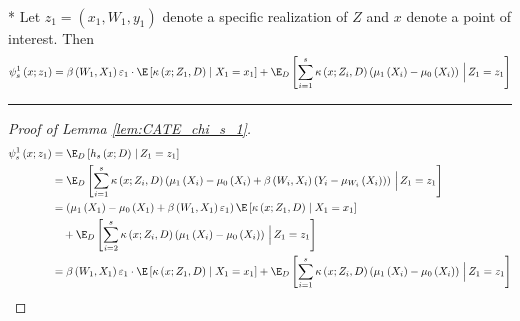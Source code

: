\begin{lem}\label{lem:CATE_chi_s_1}\mbox{}\\*
	Let $z_1 = (x_1, W_{1}, y_1)$ denote a specific realization of $Z$ and $x$ denote a point of interest.
	Then
	\begin{equation}
		\psi_{s}^{1}\left(x; z_1\right)
		= \beta\left(W_{1}, X_1\right)\varepsilon_{1} \cdot \E\left[\kappa\left(x; Z_1, D\right) \; \middle| \; X_1 = x_1\right]
		+ \E_{D}\left[\sum_{i = 1}^{s} \kappa\left(x; Z_{i}, D\right) \left(\mu_{1}\left(X_{i}\right) - \mu_{0}\left(X_{i}\right)\right)
		\, \Big| \, Z_1 = z_1 \right]
	\end{equation}
\end{lem}
\hrule
\begin{proof}[Proof of Lemma \ref{lem:CATE_chi_s_1}]
	\begin{equation}
		\begin{aligned}
			\psi_{s}^{1}\left(x; z_1\right)
			 & = \E_{D}\left[h_{s}\left(x; D\right) \, | \, Z_1 = z_1 \right] \\
			 & = \E_{D}\left[\sum_{i = 1}^{s} \kappa\left(x; Z_{i}, D\right) \left(\mu_{1}\left(X_{i}\right) - \mu_{0}\left(X_{i}\right) + \beta\left(W_{i}, X_{i}\right)\left(Y_{i} - \mu_{W_{i}}\left(X_{i}\right)\right)\right)
			 \, \Big| \, Z_1 = z_1 \right]\\
			 & = \left(\mu_{1}\left(X_1\right) - \mu_{0}\left(X_1\right) + \beta\left(W_{1}, X_1\right)\varepsilon_{1}\right)\E\left[\kappa\left(x; Z_1, D\right) \; \middle| \; X_1 = x_1\right]\\
			 & \quad + \E_{D}\left[\sum_{i = 2}^{s} \kappa\left(x; Z_{i}, D\right) \left(\mu_{1}\left(X_{i}\right) - \mu_{0}\left(X_{i}\right)\right)
			 \, \Big| \, Z_1 = z_1 \right]\\
			 & = \beta\left(W_{1}, X_1\right)\varepsilon_{1} \cdot \E\left[\kappa\left(x; Z_1, D\right) \; \middle| \; X_1 = x_1\right]
			 + \E_{D}\left[\sum_{i = 1}^{s} \kappa\left(x; Z_{i}, D\right) \left(\mu_{1}\left(X_{i}\right) - \mu_{0}\left(X_{i}\right)\right)
			 \, \Big| \, Z_1 = z_1 \right]
		\end{aligned}
	\end{equation}
\end{proof}


